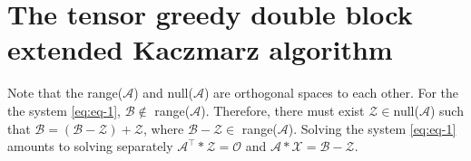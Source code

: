 \documentclass[11pt]{article}
\def\fm#1{\mathcal{#1}}
\begin{document}
\section{The tensor greedy double block extended Kaczmarz algorithm}\label{sec:tdgbek}

Note that the range($\fm A $) and null($\fm A$) are orthogonal spaces to each other. For the the system  \eqref{eq:eq-1}, $\fm B \notin$ range($\fm A $). Therefore, there must exist $\fm Z \in $null($\fm A$) such that $\fm B= (\fm B - \fm Z )  + \fm Z $, where $\fm B- \fm Z \in $ range($\fm A$). Solving the system \eqref{eq:eq-1}  amounts to solving separately $\fm A^\top * \fm Z = \fm O$ and $\fm A* \fm X = \fm B - \fm Z$.

\end{document}
